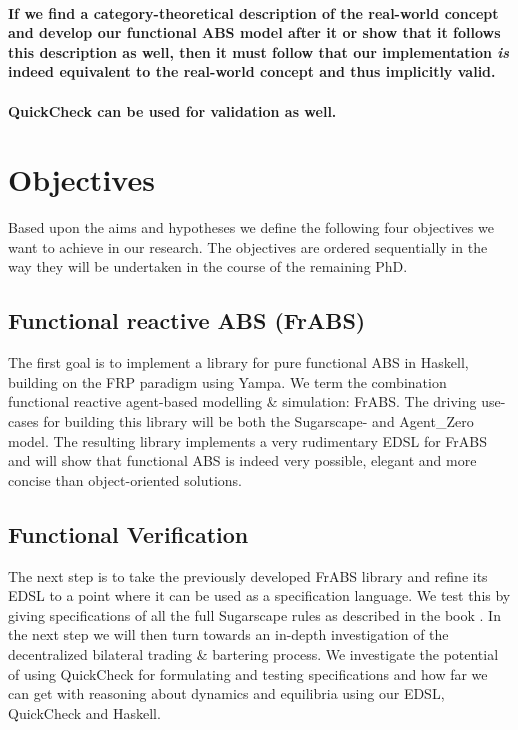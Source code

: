 \paragraph{If we find a category-theoretical description of the real-world concept and develop our functional ABS model after it or show that it follows this description as well, then it must follow that our implementation \textit{is} indeed equivalent to the real-world concept and thus implicitly valid.}
\paragraph{QuickCheck can be used for validation as well.}



\section{Objectives}
Based upon the aims and hypotheses we define the following four objectives we want to achieve in our research. The objectives are ordered sequentially in the way they will be undertaken in the course of the remaining PhD.

\subsection{Functional reactive ABS (FrABS)}
The first goal is to implement a library for pure functional ABS in Haskell, building on the FRP paradigm using Yampa. We term the combination functional reactive agent-based modelling \& simulation: FrABS. The driving use-cases for building this library will be both the Sugarscape- and Agent\_Zero model. The resulting library implements a very rudimentary EDSL for FrABS and will show that functional ABS is indeed very possible, elegant and more concise than object-oriented solutions.

\subsection{Functional Verification}
The next step is to take the previously developed FrABS library and refine its EDSL to a point where it can be used as a specification language. We test this by giving specifications of all the full Sugarscape rules as described in the book \cite{epstein_growing_1996}. In the next step we will then turn towards an in-depth investigation of the decentralized bilateral trading \& bartering process. We investigate the potential of using QuickCheck for formulating and testing specifications and how far we can get with reasoning about dynamics and equilibria using our EDSL, QuickCheck and Haskell.

